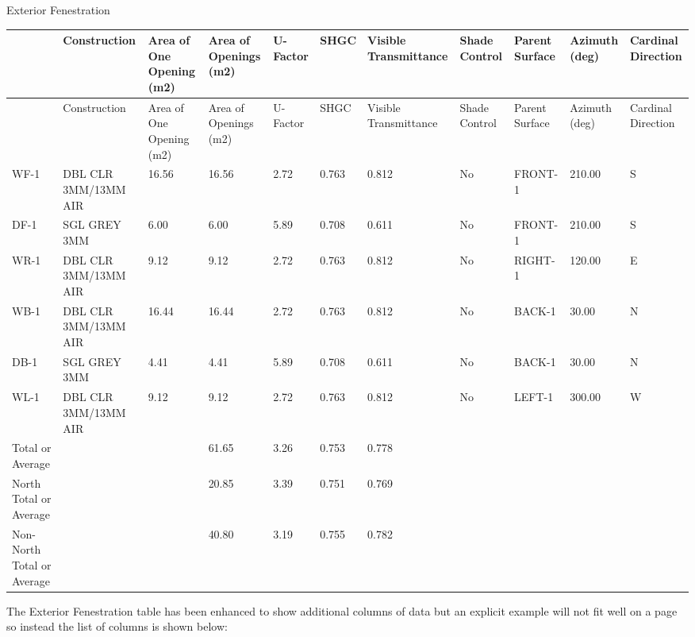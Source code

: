 Exterior Fenestration

{\scriptsize
\begin{longtable}[c]{>{\raggedright}p{0.5in}>{\raggedright}p{0.5in}>{\raggedright}p{0.5in}>{\raggedright}p{0.5in}>{\raggedright}p{0.5in}>{\raggedright}p{0.5in}>{\raggedright}p{0.5in}>{\raggedright}p{0.5in}>{\raggedright}p{0.5in}>{\raggedright}p{0.5in}>{\raggedright}p{0.5in}}
\toprule 
~ & Construction & Area of One Opening (m2) & Area of Openings (m2) & U-Factor & SHGC & Visible Transmittance & Shade Control & Parent Surface & Azimuth (deg) & Cardinal Direction \tabularnewline
\midrule
\endfirsthead

\toprule 
~ & Construction & Area of One Opening (m2) & Area of Openings (m2) & U-Factor & SHGC & Visible Transmittance & Shade Control & Parent Surface & Azimuth (deg) & Cardinal Direction \tabularnewline
\midrule
\endhead

WF-1 & DBL CLR 3MM/13MM AIR & 16.56 & 16.56 & 2.72 & 0.763 & 0.812 & No & FRONT-1 & 210.00 & S \tabularnewline
DF-1 & SGL GREY 3MM & 6.00 & 6.00 & 5.89 & 0.708 & 0.611 & No & FRONT-1 & 210.00 & S \tabularnewline
WR-1 & DBL CLR 3MM/13MM AIR & 9.12 & 9.12 & 2.72 & 0.763 & 0.812 & No & RIGHT-1 & 120.00 & E \tabularnewline
WB-1 & DBL CLR 3MM/13MM AIR & 16.44 & 16.44 & 2.72 & 0.763 & 0.812 & No & BACK-1 & 30.00 & N \tabularnewline
DB-1 & SGL GREY 3MM & 4.41 & 4.41 & 5.89 & 0.708 & 0.611 & No & BACK-1 & 30.00 & N \tabularnewline
WL-1 & DBL CLR 3MM/13MM AIR & 9.12 & 9.12 & 2.72 & 0.763 & 0.812 & No & LEFT-1 & 300.00 & W \tabularnewline
Total or Average & ~ & ~ & 61.65 & 3.26 & 0.753 & 0.778 & ~ & ~ & ~ & ~ \tabularnewline
North Total or Average & ~ & ~ & 20.85 & 3.39 & 0.751 & 0.769 & ~ & ~ & ~ & ~ \tabularnewline
Non-North Total or Average & ~ & ~ & 40.80 & 3.19 & 0.755 & 0.782 & ~ & ~ & ~ & ~ \tabularnewline
\bottomrule
\end{longtable}}

The Exterior Fenestration table has been enhanced to show additional columns of data but an explicit example will not fit well on a page so instead the list of columns is shown below:

